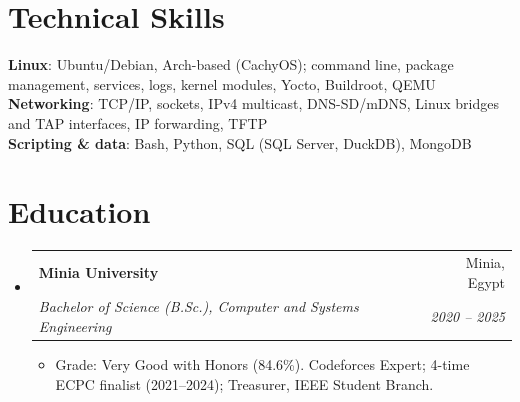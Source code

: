 \documentclass[letterpaper,11pt]{article}
\makeatletter
\newcommand{\resumeItem}[1]{
  \item\small{
    {#1 \vspace{-2pt}}
  }
}
\newcommand{\resumeSubheading}[4]{
  \vspace{-2pt}\item
    \begin{tabular*}{0.97\textwidth}[t]{l@{\extracolsep{\fill}}r}
      \textbf{#1} & #2 \\
      \textit{\small#3} & \textit{\small #4} \\
    \end{tabular*}\vspace{-7pt}
}
\newcommand{\resumeSubHeadingListStart}{\begin{itemize}[leftmargin=0.15in, label={}]}
\newcommand{\resumeSubHeadingListEnd}{\end{itemize}}
\newcommand{\resumeItemListStart}{\begin{itemize}}
\newcommand{\resumeItemListEnd}{\end{itemize}\vspace{-5pt}}
\makeatother
\begin{document}
%
\section{Technical Skills}
 \begin{itemize}[leftmargin=0.15in, label={}]
    \small{\item{
     \textbf{Linux}{: Ubuntu/Debian, Arch-based (CachyOS); command line, package management, services, logs, kernel modules, Yocto, Buildroot, QEMU} \\
     \textbf{Networking}{: TCP/IP, sockets, IPv4 multicast, DNS-SD/mDNS, Linux bridges and TAP interfaces, IP forwarding, TFTP} \\
     \textbf{Scripting \& data}{: Bash, Python, SQL (SQL Server, DuckDB), MongoDB}
    }}
 \end{itemize}

\section{Education}
  \resumeSubHeadingListStart
    \resumeSubheading
      {Minia University}{Minia, Egypt}
      {Bachelor of Science (B.Sc.), Computer and Systems Engineering}{2020 -- 2025}
      \resumeItemListStart
        \resumeItem{Grade: Very Good with Honors (84.6\%). Codeforces Expert; 4-time ECPC finalist (2021--2024); Treasurer, IEEE Student Branch.}
      \resumeItemListEnd
  \resumeSubHeadingListEnd


\end{document}
